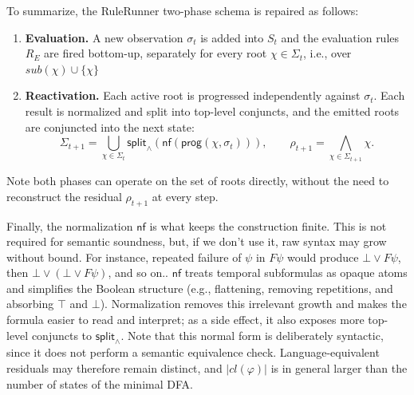 To summarize, the RuleRunner two-phase schema is repaired as follows:

\begin{enumerate}
    \item \textbf{Evaluation.}
    A new observation $\sigma_t$ is added into $S_t$ and the evaluation rules $R_E$ are fired bottom-up, separately for every root $\chi\in\Sigma_t$, i.e., over $sub(\chi)\cup\{\chi\}$
    \item \textbf{Reactivation.}
    Each active root is progressed independently against $\sigma_t$. Each result is normalized and split into top-level conjuncts, and the emitted roots are conjuncted into the next state:
    \[
        \Sigma_{t+1}
        = \bigcup_{\chi\in\Sigma_t}
          \mathsf{split}_\wedge\!\left(
             \mathsf{nf}(\mathsf{prog}(\chi,\sigma_t))
          \right),
        \qquad
        \rho_{t+1}=\bigwedge_{\chi\in\Sigma_{t+1}}\chi.
    \]
\end{enumerate}

\noindent
Note both phases can operate on the set of roots directly, without the need to reconstruct the residual $\rho_{t+1}$ at every step.


Finally, the normalization $\mathsf{nf}$ is what keeps the construction finite. This is not required for semantic soundness, but, if we don't use it, raw syntax may grow without bound. For instance, repeated failure of $\psi$ in $F\psi$ would produce $\bot\lor F\psi$, then $\bot\lor(\bot\lor F\psi)$, and so on.. $\mathsf{nf}$ treats temporal subformulas as opaque atoms and simplifies the Boolean structure (e.g., flattening, removing repetitions, and absorbing $\top$ and $\bot$). Normalization removes this irrelevant growth and makes the formula easier to read and interpret; as a side effect, it also exposes more top-level conjuncts to $\mathsf{split}_\wedge$. Note that this normal form is deliberately syntactic, since it does not perform a semantic equivalence check. Language-equivalent residuals may therefore remain distinct, and $|cl(\varphi)|$ is in general larger than the number of states of the minimal DFA.

